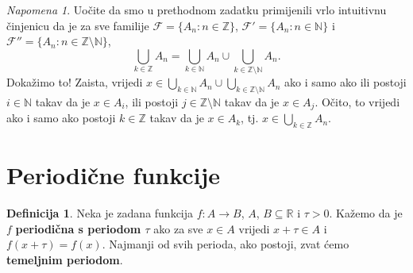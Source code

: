 \documentclass{book}
\theoremstyle{definition}
\theoremstyle{definition}
\newtheorem{definition}{Definicija}
\theoremstyle{remark}
\newtheorem{remark}{Napomena}
\begin{document}
\newpage
\begin{remark}
Uočite da smo u prethodnom zadatku primijenili vrlo intuitivnu činjenicu da je za sve familije $\mathcal{F}=\{A_n : n\in \mathbb{Z}\}$, $\mathcal{F}'=\{A_n : n\in \mathbb{N}\}$ i $\mathcal{F}''=\{A_n : n\in \mathbb{Z}\setminus\mathbb{N}\}$,
$$\bigcup_{k\in \mathbb{Z}}{A_n}=\bigcup_{k\in \mathbb{N}}{A_n}\cup \bigcup_{k\in \mathbb{Z}\setminus\mathbb{N}}{A_n}.$$
Dokažimo to! Zaista, vrijedi $\displaystyle x\in \bigcup_{k\in \mathbb{N}}{A_n}\cup \bigcup_{k\in \mathbb{Z}\setminus\mathbb{N}}{A_n}$ ako i samo ako ili postoji $i\in \mathbb{N}$ takav da je $x\in A_i$, ili postoji $j\in \mathbb{Z}\setminus\mathbb{N}$ takav da je $x\in A_j$. Očito, to vrijedi ako i samo ako postoji $k\in \mathbb{Z}$ takav da je $x\in A_k$, tj. $\displaystyle x\in \bigcup_{k\in \mathbb{Z}}{A_n}$.
\end{remark}

\section{Periodične funkcije}

\begin{definition}
Neka je zadana funkcija $f : A\to B$, $A$, $B\subseteq \mathbb{R}$ i $\tau>0$. Kažemo da je $f$ \textbf{periodična s periodom $\tau$} ako za sve $x\in A$ vrijedi $x+\tau \in A$ i $f(x+\tau)=f(x)$. Najmanji od svih perioda, ako postoji, zvat ćemo \textbf{temeljnim periodom}.
\end{definition}
\end{document}
